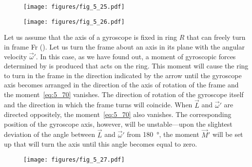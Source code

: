 \begin{figure}[t]
	\begin{minipage}[t]{0.45\linewidth}
		\begin{center}
			\texttt{[image: figures/fig\_5\_25.pdf]}
			\caption[]{}
			\label{fig:5_25}
		\end{center}
	\end{minipage}
	\hspace{-0.05cm}
	\begin{minipage}[t]{0.55\linewidth}
		\begin{center}
			\texttt{[image: figures/fig\_5\_26.pdf]}
			\caption[]{}
			\label{fig:5_26}
		\end{center}
	\end{minipage}
	\vspace{-0.65cm}
\end{figure}

Let us assume that the axis of a gyroscope is fixed in ring $R$ that can freely turn in frame Fr (). Let us turn the frame about an axis in its plane with the angular velocity $\vec{\omega}'$. In this case, as we have found out, a moment of gyroscopic forces determined by  is produced that acts on the ring. This moment will cause the ring to turn in the frame in the direction indicated by the arrow until the gyroscope axis becomes arranged in the direction of the axis of rotation of the frame and the moment~\eqref{eq:5_70} vanishes. The direction of rotation of the gyroscope itself and the direction in which the frame turns will coincide. When $\vec{L}$ and $\vec{\omega}'$ are directed oppositely, the moment~\eqref{eq:5_70} also vanishes. The corresponding position of the gyroscope axis, however, will be unstable---upon the slightest deviation of the angle between $\vec{L}$ and $\vec{\omega}'$ from \SI{180}{\degree}, the moment $\vec{M}'$ will be set up that will turn the axis until this angle becomes equal to zero.

\begin{figure}[t]
	\begin{center}
		\texttt{[image: figures/fig\_5\_27.pdf]}
		\caption[]{}
		\label{fig:5_27}
	\end{center}
	\vspace{-0.9cm}
\end{figure}

